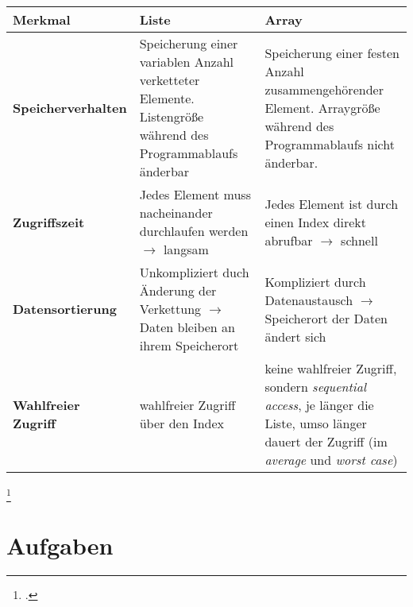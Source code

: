 \documentclass{lehramt-informatik-haupt}
\begin{document}
\begin{tabularx}{\linewidth}{|l|X|X|}

\hline
%

\textbf{Merkmal} & \textbf{Liste} & \textbf{Array}
\\
\hline\hline

%

\textbf{Speicherverhalten} &

Speicherung einer variablen Anzahl verketteter Elemente. Listengröße
während des Programmablaufs änderbar &

Speicherung einer festen Anzahl zusammengehörender Element. Arraygröße
während des Programmablaufs nicht änderbar.

\\
\hline

%

\textbf{Zugriffszeit} &

Jedes Element muss nacheinander durchlaufen werden $\rightarrow$ langsam
&

Jedes Element ist durch einen Index direkt abrufbar $\rightarrow$
schnell

\\
\hline

%

\textbf{Datensortierung} &

Unkompliziert duch Änderung der Verkettung $\rightarrow$
Daten bleiben an ihrem Speicherort &

Kompliziert durch Datenaustausch $\rightarrow$
Speicherort der Daten ändert sich

\\
\hline

\textbf{Wahlfreier Zugriff} &

wahlfreier Zugriff über den Index &

keine wahlfreier Zugriff, sondern \emph{sequential access}, je länger
die Liste, umso länger dauert der Zugriff (im \emph{average} und
\emph{worst case})

\end{tabularx}
\footcite[Seite 8]{aud:fs:4}


\chapter{Aufgaben}
\end{document}
